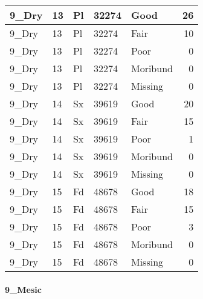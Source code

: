 \documentclass[
]{article}
\begin{document}
\begin{tabular}{l|l|l|l|l|r}
\hline
9\_Dry & 13 & Pl & 32274 & Good & 26\\
\hline
9\_Dry & 13 & Pl & 32274 & Fair & 10\\
\hline
9\_Dry & 13 & Pl & 32274 & Poor & 0\\
\hline
9\_Dry & 13 & Pl & 32274 & Moribund & 0\\
\hline
9\_Dry & 13 & Pl & 32274 & Missing & 0\\
\hline
9\_Dry & 14 & Sx & 39619 & Good & 20\\
\hline
9\_Dry & 14 & Sx & 39619 & Fair & 15\\
\hline
9\_Dry & 14 & Sx & 39619 & Poor & 1\\
\hline
9\_Dry & 14 & Sx & 39619 & Moribund & 0\\
\hline
9\_Dry & 14 & Sx & 39619 & Missing & 0\\
\hline
9\_Dry & 15 & Fd & 48678 & Good & 18\\
\hline
9\_Dry & 15 & Fd & 48678 & Fair & 15\\
\hline
9\_Dry & 15 & Fd & 48678 & Poor & 3\\
\hline
9\_Dry & 15 & Fd & 48678 & Moribund & 0\\
\hline
9\_Dry & 15 & Fd & 48678 & Missing & 0\\
\hline
\end{tabular}

\hypertarget{mesic-11}{%
\paragraph{9\_Mesic}\label{mesic-11}}
\end{document}
